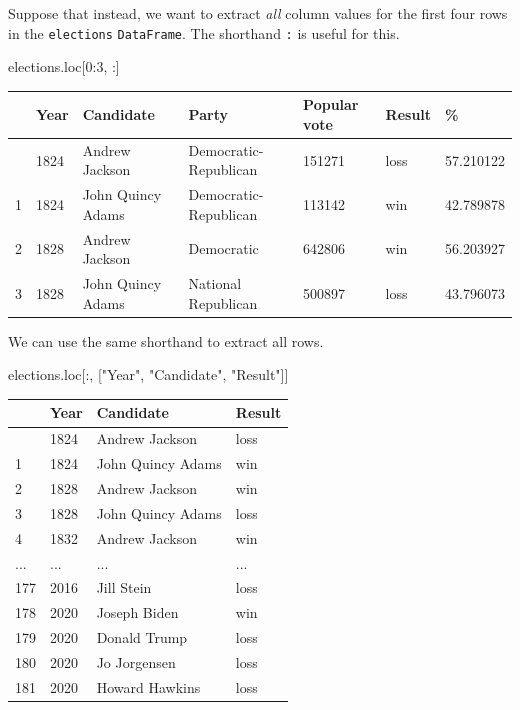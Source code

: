 \documentclass[
  letterpaper,
  DIV=11,
  numbers=noendperiod]{scrreprt}
\newenvironment{Shaded}{\begin{snugshade}}{\end{snugshade}}
\newcommand{\DecValTok}[1]{\textcolor[rgb]{0.68,0.00,0.00}{#1}}
\newcommand{\NormalTok}[1]{\textcolor[rgb]{0.00,0.23,0.31}{#1}}
\newcommand{\StringTok}[1]{\textcolor[rgb]{0.13,0.47,0.30}{#1}}
\begin{document}
Suppose that instead, we want to extract \emph{all} column values for
the first four rows in the \texttt{elections} \texttt{DataFrame}. The
shorthand \texttt{:} is useful for this.

\begin{Shaded}
\begin{Highlighting}[]
\NormalTok{elections.loc[}\DecValTok{0}\NormalTok{:}\DecValTok{3}\NormalTok{, :]}
\end{Highlighting}
\end{Shaded}

\begin{longtable}[]{@{}lllllll@{}}
\toprule\noalign{}
& Year & Candidate & Party & Popular vote & Result & \% \\
\midrule\noalign{}
\endhead
\bottomrule\noalign{}
\endlastfoot
0 & 1824 & Andrew Jackson & Democratic-Republican & 151271 & loss &
57.210122 \\
1 & 1824 & John Quincy Adams & Democratic-Republican & 113142 & win &
42.789878 \\
2 & 1828 & Andrew Jackson & Democratic & 642806 & win & 56.203927 \\
3 & 1828 & John Quincy Adams & National Republican & 500897 & loss &
43.796073 \\
\end{longtable}

We can use the same shorthand to extract all rows.

\begin{Shaded}
\begin{Highlighting}[]
\NormalTok{elections.loc[:, [}\StringTok{"Year"}\NormalTok{, }\StringTok{"Candidate"}\NormalTok{, }\StringTok{"Result"}\NormalTok{]]}
\end{Highlighting}
\end{Shaded}

\begin{longtable}[]{@{}llll@{}}
\toprule\noalign{}
& Year & Candidate & Result \\
\midrule\noalign{}
\endhead
\bottomrule\noalign{}
\endlastfoot
0 & 1824 & Andrew Jackson & loss \\
1 & 1824 & John Quincy Adams & win \\
2 & 1828 & Andrew Jackson & win \\
3 & 1828 & John Quincy Adams & loss \\
4 & 1832 & Andrew Jackson & win \\
... & ... & ... & ... \\
177 & 2016 & Jill Stein & loss \\
178 & 2020 & Joseph Biden & win \\
179 & 2020 & Donald Trump & loss \\
180 & 2020 & Jo Jorgensen & loss \\
181 & 2020 & Howard Hawkins & loss \\
\end{longtable}
\end{document}
